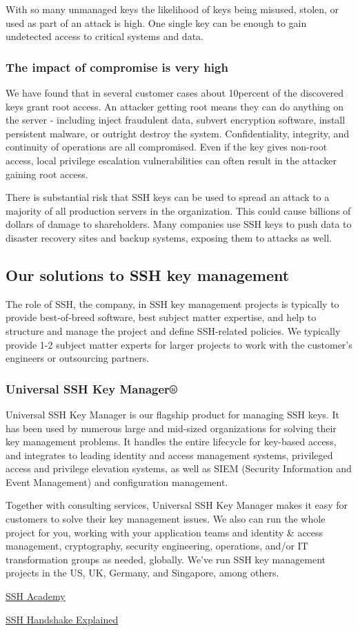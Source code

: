 \documentclass{article}
\begin{document}
With so many unmanaged keys the likelihood of keys being misused, stolen, or used as part of an attack is high. One single key can be enough to gain undetected access to critical systems and data.

\subsubsection{The impact of compromise is very high}
We have found that in several customer cases about 10percent of the discovered keys grant root access. An attacker getting root means they can do anything on the server - including inject fraudulent data, subvert encryption software, install persistent malware, or outright destroy the system. Confidentiality, integrity, and continuity of operations are all compromised. Even if the key gives non-root access, local privilege escalation vulnerabilities can often result in the attacker gaining root access.

There is substantial risk that SSH keys can be used to spread an attack to a majority of all production servers in the organization. This could cause billions of dollars of damage to shareholders. Many companies use SSH keys to push data to disaster recovery sites and backup systems, exposing them to attacks as well.

\subsection{Our solutions to SSH key management}
The role of SSH, the company, in SSH key management projects is typically to provide best-of-breed software, best subject matter expertise, and help to structure and manage the project and define SSH-related policies. We typically provide 1-2 subject matter experts for larger projects to work with the customer's engineers or outsourcing partners.

\subsubsection{Universal SSH Key Manager®}
Universal SSH Key Manager is our flagship product for managing SSH keys. It has been used by numerous large and mid-sized organizations for solving their key management problems. It handles the entire lifecycle for key-based access, and integrates to leading identity and access management systems, privileged access and privilege elevation systems, as well as SIEM (Security Information and Event Management) and configuration management.

Together with consulting services, Universal SSH Key Manager makes it easy for customers to solve their key management issues. We also can run the whole project for you, working with your application teams and identity & access management, cryptography, security engineering, operations, and/or IT transformation groups as needed, globally. We've run SSH key management projects in the US, UK, Germany, and Singapore, among others.




\href{https://www.ssh.com/academy/ssh} {SSH Academy}

\href{https://goteleport.com/blog/ssh-handshake-explained/} {SSH Handshake Explained}
\end{document}
